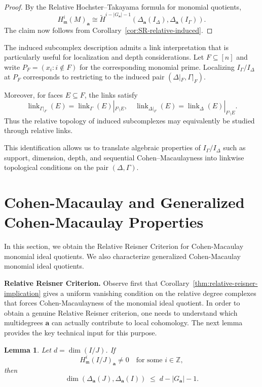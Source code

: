 \documentclass[12pt]{amsart}
\numberwithin{equation}{section}
\newtheorem{lemma}[theorem]{Lemma}
\theoremstyle{definition}
\theoremstyle{definition}
\DeclareMathOperator{\link}{link}
\newcommand{\ZZ}{{\mathbb Z}}
\def\mm{{\mathfrak m}}
\begin{document}
\begin{proof}
	By the Relative Hochster--Takayama formula for monomial quotients,
	\[
	H^i_{\mathfrak m}(M)_{\mathbf a}
	\cong
	\widetilde H^{i-|G_{\mathbf a}|-1}
	\left(\Delta_{\mathbf a}(I_\Delta),\Delta_{\mathbf a}(I_\Gamma)\right).
	\]
	The claim now follows from Corollary~\ref{cor:SR-relative-induced}.
\end{proof}


The induced subcomplex description admits a link interpretation that is particularly
useful for localization and depth considerations.
Let $F\subseteq[n]$ and write $P_F=(x_i : i\notin F)$ for the corresponding monomial prime.
Localizing $I_\Gamma/I_\Delta$ at $P_F$ corresponds to restricting to the induced pair
$(\Delta|_F,\Gamma|_F)$.

Moreover, for faces $E\subseteq F$, the links satisfy
\[
\link_{\Gamma|_F}(E)=\link_\Gamma(E)|_{F\setminus E},
\quad
\link_{\Delta|_F}(E)=\link_\Delta(E)|_{F\setminus E}.
\]
Thus the relative topology of induced subcomplexes may equivalently be studied through
relative links.

This identification allows us to translate algebraic properties of
$I_\Gamma/I_\Delta$ such as support, dimension, depth, and sequential Cohen--Macaulayness
into linkwise topological conditions on the pair $(\Delta,\Gamma)$.




\section{Cohen-Macaulay and Generalized Cohen-Macaulay Properties} \label{sec.gCMB}

In this section, we obtain the Relative Reisner Criterion for Cohen-Macaulay monomial ideal quotients. We also characterize generalized Cohen-Macaulay monomial ideal quotients.

\medskip

\noindent\textbf{Relative Reisner Criterion.} Observe first that Corollary~\ref{thm:relative-reisner-implication} gives a uniform vanishing condition on the relative degree complexes that forces Cohen-Macaulayness of the monomial ideal quotient.
In order to obtain a genuine Relative Reisner criterion, one needs to
understand which multidegrees $\mathbf a$ can actually contribute to
local cohomology. The next lemma provides the key technical input for this purpose.

\begin{lemma}\label{lem:relevance-bound}
	Let $d=\dim(I/J)$. 
	If
	\[
	H^i_{\mm}(I/J)_{\mathbf a}\neq 0
	\quad\text{for some } i\in\ZZ,
	\]
	then
	\[
	\dim\!\left(\Delta_{\mathbf a}(J),\Delta_{\mathbf a}(I)\right)
	\;\le\;
	d-|G_{\mathbf a}|-1.
	\]
\end{lemma}
\end{document}
